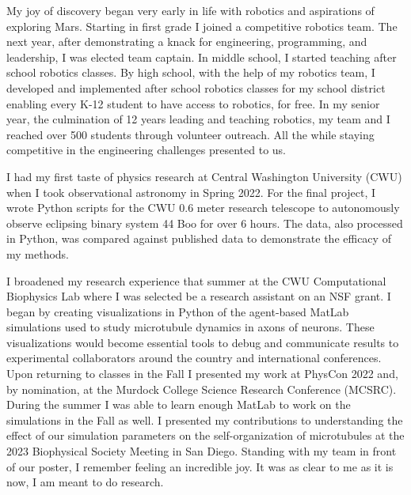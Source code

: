 \documentclass[a4paper, 12pt]{article}
\begin{document}

My joy of discovery began very early in life with robotics and aspirations of exploring Mars. Starting in first grade I joined a competitive robotics team. The next year, after demonstrating a knack for engineering, programming, and leadership, I was elected team captain. In middle school, I started teaching after school robotics classes. By high school, with the help of my robotics team, I developed and implemented after school robotics classes for my school district enabling every K-12 student to have access to robotics, for free. In my senior year, the culmination of 12 years leading and teaching robotics, my team and I reached over 500 students through volunteer outreach. All the while staying competitive in the engineering challenges presented to us.

I had my first taste of physics research at Central Washington University (CWU) when I took observational astronomy in Spring 2022. For the final project, I wrote Python scripts for the CWU 0.6 meter research telescope to autonomously observe eclipsing binary system 44 Boo for over 6 hours. The data, also processed in Python, was compared against published data to demonstrate the efficacy of my methods.

I broadened my research experience that summer at the CWU Computational Biophysics Lab where I was selected be a research assistant on an NSF grant. I began by creating visualizations in Python of the agent-based MatLab simulations used to study microtubule dynamics in axons of neurons. These visualizations would become essential tools to debug and communicate results to experimental collaborators around the country and international conferences. Upon returning to classes in the Fall I presented my work at PhysCon 2022 and, by nomination, at the Murdock College Science Research Conference (MCSRC). During the summer I was able to learn enough MatLab to work on the simulations in the Fall as well. I presented my contributions to understanding the effect of our simulation parameters on the self-organization of microtubules at the 2023 Biophysical Society Meeting in San Diego. Standing with my team in front of our poster, I remember feeling an incredible joy. It was as clear to me as it is now, I am meant to do research.
\end{document}
